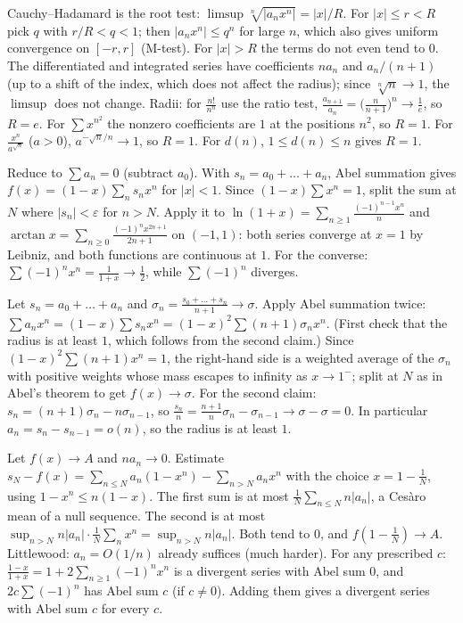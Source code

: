 \documentclass[11pt,a4paper]{article}
\begin{document}

Cauchy--Hadamard is the root test: \(\limsup\sqrt[n]{\lvert a_nx^n\rvert}=\lvert x\rvert/R\). For \(\lvert x\rvert\le r\lt R\) pick \(q\) with \(r/R\lt q\lt1\); then \(\lvert a_nx^n\rvert\le q^n\) for large \(n\), which also gives uniform convergence on \([-r,r]\) (M-test). For \(\lvert x\rvert\gt R\) the terms do not even tend to \(0\).
The differentiated and integrated series have coefficients \(na_n\) and \(a_n/(n+1)\) (up to a shift of the index, which does not affect the radius); since \(\sqrt[n]n\to1\), the \(\limsup\) does not change.
Radii: for \(\frac{n!}{n^n}\) use the ratio test, \(\frac{a_{n+1}}{a_n}=\bigl(\frac n{n+1}\bigr)^n\to\frac1e\), so \(R=e\). For \(\sum x^{n^2}\) the nonzero coefficients are \(1\) at the positions \(n^2\), so \(R=1\). For \(\frac{x^n}{a^{\sqrt n}}\) (\(a\gt0\)), \(a^{-\sqrt n/n}\to1\), so \(R=1\). For \(d(n)\), \(1\le d(n)\le n\) gives \(R=1\).

Reduce to \(\sum a_n=0\) (subtract \(a_0\)). With \(s_n=a_0+\dots+a_n\), Abel summation gives \(f(x)=(1-x)\sum_n s_nx^n\) for \(\lvert x\rvert\lt1\). Since \((1-x)\sum x^n=1\), split the sum at \(N\) where \(\lvert s_n\rvert\lt\varepsilon\) for \(n\gt N\).
Apply it to \(\ln(1+x)=\sum_{n\ge1}\frac{(-1)^{n-1}x^n}n\) and \(\arctan x=\sum_{n\ge0}\frac{(-1)^nx^{2n+1}}{2n+1}\) on \((-1,1)\): both series converge at \(x=1\) by Leibniz, and both functions are continuous at \(1\). For the converse: \(\sum(-1)^nx^n=\frac1{1+x}\to\frac12\), while \(\sum(-1)^n\) diverges.

Let \(s_n=a_0+\dots+a_n\) and \(\sigma_n=\frac{s_0+\dots+s_n}{n+1}\to\sigma\). Apply Abel summation twice: \(\sum a_nx^n=(1-x)\sum s_nx^n=(1-x)^2\sum(n+1)\sigma_nx^n\). (First check that the radius is at least \(1\), which follows from the second claim.)
Since \((1-x)^2\sum(n+1)x^n=1\), the right-hand side is a weighted average of the \(\sigma_n\) with positive weights whose mass escapes to infinity as \(x\to1^-\); split at \(N\) as in Abel's theorem to get \(f(x)\to\sigma\).
For the second claim: \(s_n=(n+1)\sigma_n-n\sigma_{n-1}\), so \(\frac{s_n}n=\frac{n+1}n\sigma_n-\sigma_{n-1}\to\sigma-\sigma=0\). In particular \(a_n=s_n-s_{n-1}=o(n)\), so the radius is at least \(1\).

Let \(f(x)\to A\) and \(na_n\to0\). Estimate \(s_N-f(x)=\sum_{n\le N}a_n(1-x^n)-\sum_{n\gt N}a_nx^n\) with the choice \(x=1-\frac1N\), using \(1-x^n\le n(1-x)\).
The first sum is at most \(\frac1N\sum_{n\le N}n\lvert a_n\rvert\), a Cesàro mean of a null sequence. The second is at most \(\sup_{n\gt N}n\lvert a_n\rvert\cdot\frac1N\sum_nx^n=\sup_{n\gt N}n\lvert a_n\rvert\). Both tend to \(0\), and \(f(1-\frac1N)\to A\). Littlewood: \(a_n=O(1/n)\) already suffices (much harder).
For any prescribed \(c\): \(\frac{1-x}{1+x}=1+2\sum_{n\ge1}(-1)^nx^n\) is a divergent series with Abel sum \(0\), and \(2c\sum(-1)^n\) has Abel sum \(c\) (if \(c\ne0\)). Adding them gives a divergent series with Abel sum \(c\) for every \(c\).
\end{document}
